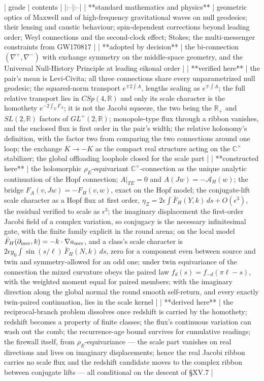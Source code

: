 | grade | contents |
|:--|:--|
| **standard mathematics and physics** | geometric optics of Maxwell and of high-frequency gravitational waves on null geodesics; their lensing and caustic behaviour; spin-dependent corrections beyond leading order; Weyl connections and the second-clock effect; Stokes; the multi-messenger constraints from GW170817 |
| **adopted by decision** | the bi-connection $(\nabla^+,\nabla^-)$ with exchange symmetry on the middle-space geometry, and the Universal Null-History Principle at leading eikonal order |
| **verified here** | the pair's mean is Levi-Civita; all three connections share every unparametrized null geodesic; the squared-norm transport $e^{\mp2\int A}$, lengths scaling as $e^{\mp\int A}$; the full relative transport lies in $CSp(4,\mathbb R)$ and only its scale character is the homothety $e^{-2\int_\Sigma F_A}$; it is not the Jacobi squeeze, the two being the $\mathbb R_+$ and $SL(2,\mathbb R)$ factors of $GL^+(2,\mathbb R)$; monopole-type flux through a ribbon vanishes, and the enclosed flux is first order in the pair's width; the relative holonomy's definition, with the factor two from comparing the two connections around one loop; the exchange $K\to-K$ as the compact real structure acting on the $\mathbb C^\times$ stabilizer; the global offloading loophole closed for the scale part |
| **constructed here** | the holomorphic $\rho_E$-equivariant $\mathbb C^\times$-connection as the unique analytic continuation of the Hopf connection; $A\vert _{TE} = 0$ and $A(Jw) = -\mathcal A_H(w)$; the bridge $F_A(v,Jw) = -F_H(v,w)$, exact on the Hopf model; the conjugate-lift scale character as a Hopf flux at first order, $\eta_\Xi = 2\epsilon\int\bar F_H(Y,k)\,ds+O(\epsilon^3)$, the residual verified to scale as $\epsilon^3$; the imaginary displacement the first-order Jacobi field of a complex variation, so conjugacy is the necessary infinitesimal gate, with the finite family explicit in the round arena; on the local model $\bar F_H(\partial_{\rm mer},k) = -k\cdot\nabla a_{\rm mer}$, and a class's scale character is $2\epsilon y_0\int\sin(s/\ell)\,\bar F_H(N,k)\,ds$, zero for a component even between source and twin and symmetry-allowed for an odd one; under twin equivariance of the connection the mixed curvature obeys the paired law $f_d(s) = f_{-d}(\pi\ell-s)$, with the weighted moment equal for paired members; with the imaginary direction along the global normal the round smooth self-return, and every exactly twin-paired continuation, lies in the scale kernel |
| **derived here** | the reciprocal-branch problem dissolves once redshift is carried by the homothety; redshift becomes a property of finite classes; the flux's continuous variation can wash out the comb; the recurrence-age bound survives for cumulative readings; the firewall itself, from $\rho_E$-equivariance — the scale part vanishes on real directions and lives on imaginary displacements; hence the real Jacobi ribbon carries no scale flux and the redshift candidate moves to the complex ribbon between conjugate lifts — all conditional on the descent of §XV.7 |
